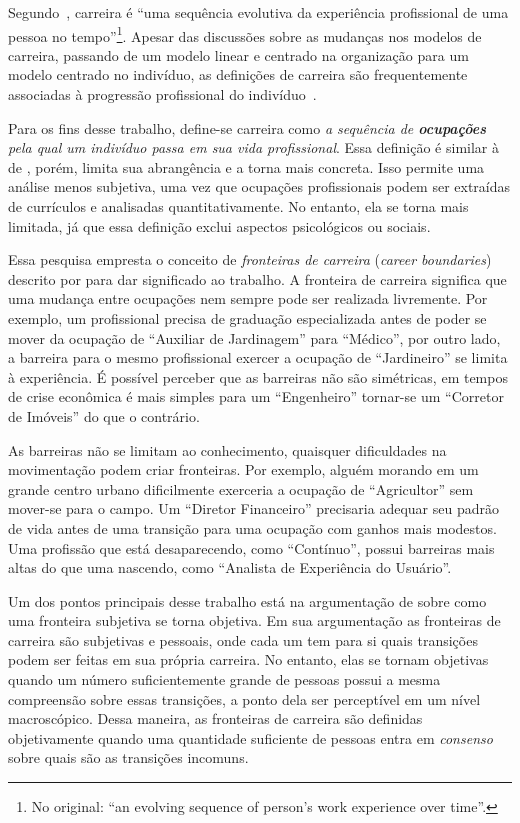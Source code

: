 \documentclass[
  article,
  11pt,
  a4paper,
  english,
  brazil,
  sumario=tradicional]{abntex2}
\begin{document}
Segundo~, carreira é \foreignquote{english}{uma sequência evolutiva da experiência profissional de uma pessoa no tempo}\footnote{No original: \enquote{an evolving sequence of person's work experience over time}.}. Apesar das discussões sobre as mudanças nos modelos de carreira, passando de um modelo linear e centrado na organização para um modelo centrado no indivíduo, as definições de carreira são frequentemente associadas à progressão profissional do indivíduo~\cite{Baruch2004-oy,Sullivan2009-xb,Bendassolli2009-bg}.

Para os fins desse trabalho, define-se carreira como \textit{a sequência de \textbf{ocupações} pela qual um indivíduo passa em sua vida profissional}. Essa definição é similar à de , porém, limita sua abrangência e a torna mais concreta. Isso permite uma análise menos subjetiva, uma vez que ocupações profissionais podem ser extraídas de currículos e analisadas quantitativamente. No entanto, ela se torna mais limitada, já que essa definição exclui aspectos psicológicos ou sociais.

Essa pesquisa empresta o conceito de \textit{fronteiras de carreira} (\textit{career boundaries}) descrito por  para dar significado ao trabalho. A fronteira de carreira significa que uma mudança entre ocupações nem sempre pode ser realizada livremente. Por exemplo, um profissional precisa de graduação especializada antes de poder se mover da ocupação de \enquote{Auxiliar de Jardinagem} para \enquote{Médico}, por outro lado, a barreira para o mesmo profissional exercer a ocupação de \enquote{Jardineiro} se limita à experiência. É possível perceber que as barreiras não são simétricas, em tempos de crise econômica é mais simples para um \enquote{Engenheiro} tornar-se um \enquote{Corretor de Imóveis} do que o contrário.

As barreiras não se limitam ao conhecimento, quaisquer dificuldades na movimentação podem criar fronteiras. Por exemplo, alguém morando em um grande centro urbano dificilmente exerceria a ocupação de \enquote{Agricultor} sem mover-se para o campo. Um \enquote{Diretor Financeiro} precisaria adequar seu padrão de vida antes de uma transição para uma ocupação com ganhos mais modestos. Uma profissão que está desaparecendo, como \enquote{Contínuo}, possui barreiras mais altas do que uma nascendo, como \enquote{Analista de Experiência do Usuário}.

Um dos pontos principais desse trabalho está na argumentação de  sobre como uma fronteira subjetiva se torna objetiva. Em sua argumentação as fronteiras de carreira são subjetivas e pessoais, onde cada um tem para si quais transições podem ser feitas em sua própria carreira. No entanto, elas se tornam objetivas quando um número suficientemente grande de pessoas possui a mesma compreensão sobre essas transições, a ponto dela ser perceptível em um nível macroscópico. Dessa maneira, as fronteiras de carreira são definidas objetivamente quando uma quantidade suficiente de pessoas entra em \textit{consenso} sobre quais são as transições incomuns.
\end{document}
